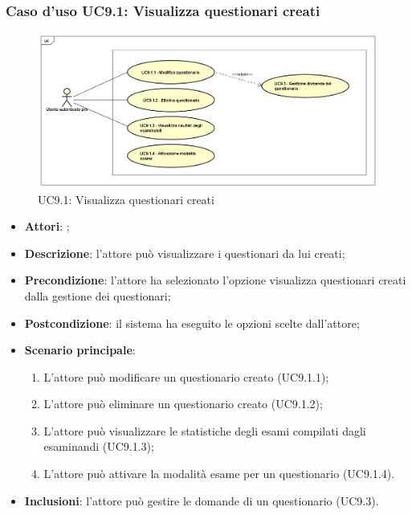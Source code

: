 		\subsubsection{Caso d'uso UC9.1: Visualizza questionari creati}
		\label{UC9.1}
		\begin{figure}[h]
			\centering
		\includegraphics[scale=0.44,keepaspectratio]{UML/UC9_1.png}
			\caption{UC9.1: Visualizza questionari creati}
		\end{figure}
		\FloatBarrier
		\begin{itemize}
			\item \textbf{Attori}: \uaupro{};
			\item \textbf{Descrizione}: l'attore può visualizzare i questionari da lui creati;
			\item \textbf{Precondizione}: l'attore ha selezionato l'opzione visualizza questionari creati dalla gestione dei questionari;
			\item \textbf{Postcondizione}: il sistema ha eseguito le opzioni scelte dall'attore;
			\item \textbf{Scenario principale}: 
				\begin{enumerate}
					\item L'attore può modificare un questionario creato (UC9.1.1);
					\item L'attore può eliminare un questionario creato (UC9.1.2);
					\item L'attore può visualizzare le statistiche degli esami compilati dagli esaminandi (UC9.1.3);
					\item L'attore può attivare la modalità esame per un questionario (UC9.1.4).
				\end{enumerate}
				\item \textbf{Inclusioni}: l'attore può gestire le domande di un questionario (UC9.3).
		\end{itemize}
		
